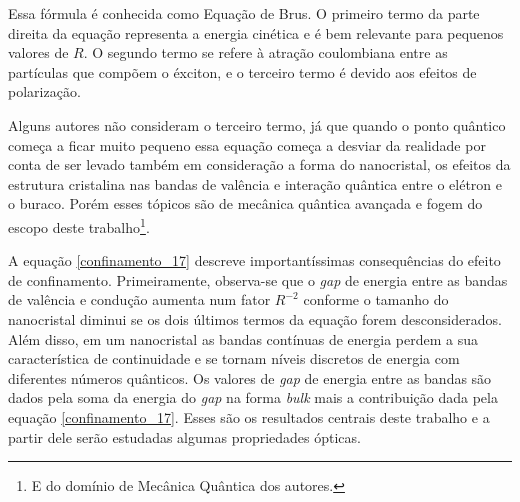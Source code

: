 \par Essa fórmula é conhecida como Equação de Brus. O primeiro termo da parte direita da equação representa a energia cinética e é bem relevante para pequenos valores de $R$. O segundo termo se refere à atração coulombiana entre as partículas que compõem o éxciton, e o terceiro termo é devido aos efeitos de polarização.

\par Alguns autores\cite{confinamento4}\cite{confinamento5} não consideram o terceiro termo, já que quando o ponto quântico começa a ficar muito pequeno essa equação começa a desviar da realidade por conta de ser levado também em consideração a forma do nanocristal, os efeitos da estrutura cristalina nas bandas de valência e interação quântica entre o elétron e o buraco. Porém  esses tópicos são de mecânica quântica avançada e fogem do escopo deste trabalho\footnote{E do domínio de Mecânica Quântica dos autores.}. 

\par A equação \eqref{confinamento_17} descreve importantíssimas consequências do efeito de confinamento. Primeiramente, observa-se que o \textit{gap} de energia entre as bandas de valência e condução aumenta num fator $R^{-2}$ conforme o tamanho do nanocristal diminui se os dois últimos termos da equação forem desconsiderados. Além disso, em um nanocristal as bandas contínuas de energia perdem a sua característica de continuidade e se tornam níveis discretos de energia com diferentes números quânticos. Os valores de \textit{gap} de energia entre as bandas são dados pela soma da energia do \textit{gap} na forma \textit{bulk} mais a contribuição dada pela equação \eqref{confinamento_17}. Esses são os resultados centrais deste trabalho e a partir dele serão estudadas algumas propriedades ópticas.